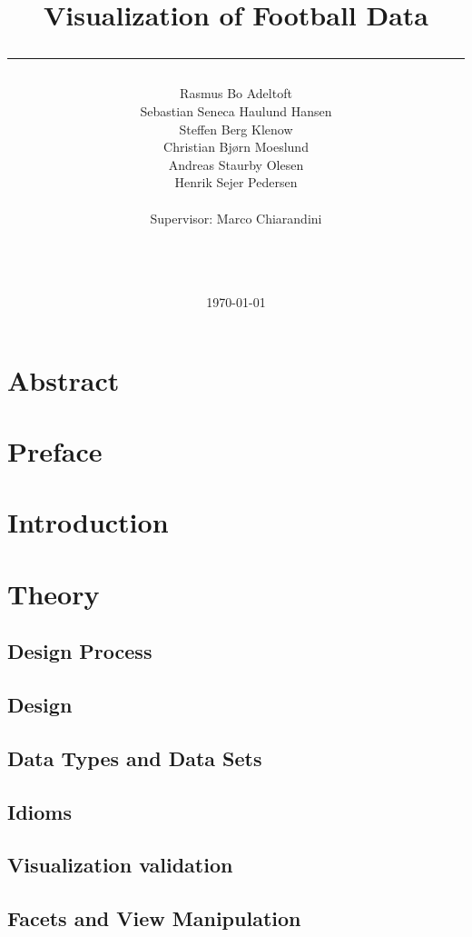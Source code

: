 \documentclass[a4paper,11pt]{article}
\title{Visualization of Football Data\\\rule{10cm}{0.5mm}}
\author{Rasmus Bo Adeltoft\\Sebastian Seneca Haulund Hansen\\Steffen Berg Klenow\\Christian Bjørn Moeslund\\Andreas Staurby Olesen\\Henrik Sejer Pedersen
\\\\Supervisor: Marco Chiarandini\\\rule{5.5cm}{0.5mm}\\}
\date{\today}
\begin{document}
\maketitle
\newpage
\section{Abstract}

\section{Preface}

\newpage
\tableofcontents
\newpage
\section{Introduction}


\section{Theory} %

\subsection{Design Process} %

\subsection{Design} %

\subsection{Data Types and Data Sets} %

\subsection{Idioms} %

\subsection{Visualization validation} %

\subsection{Facets and View Manipulation} %

\end{document}
